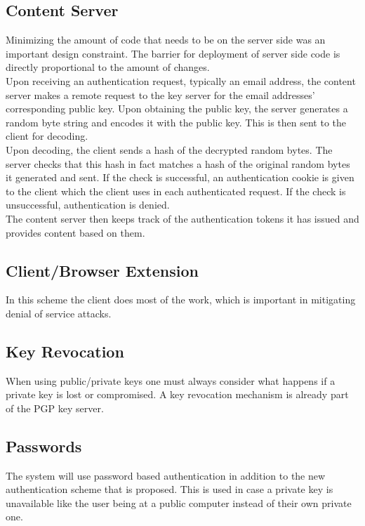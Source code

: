 \documentclass[11pt]{article}   %
\begin{document}
\subsection{Content Server} \label{sec:sol_server}
Minimizing the amount of code that needs to be on the server side was an important design constraint. The barrier for deployment of server side code is directly proportional to the amount of changes. \\
Upon receiving an authentication request, typically an email address, the content server makes a remote request to the key server for the email addresses' corresponding public key. Upon obtaining the public key, the server generates a random byte string and encodes it with the public key. This is then sent to the client for decoding. \\
Upon decoding, the client sends a hash of the decrypted random bytes. The server checks that this hash in fact matches a hash of the original random bytes it generated and sent. If the check is successful, an authentication cookie is given to the client which the client uses in each authenticated request. If the check is unsuccessful, authentication is denied. \\
The content server then keeps track of the authentication tokens it has issued and provides content based on them.

\subsection{Client/Browser Extension} \label{sec:sol_client}
In this scheme the client does most of the work, which is important in mitigating denial of service attacks. 

\subsection{Key Revocation} \label{sec:sol_key_revo}
When using public/private keys one must always consider what happens if a private key is lost or compromised. A key revocation mechanism is already part of the PGP key server. 

\subsection{Passwords} \label{sec:sol_pw}
The system will use password based authentication in addition to the new authentication scheme that is proposed. This is used in case a private key is unavailable like the user being at a public computer instead of their own private one.
\end{document}
